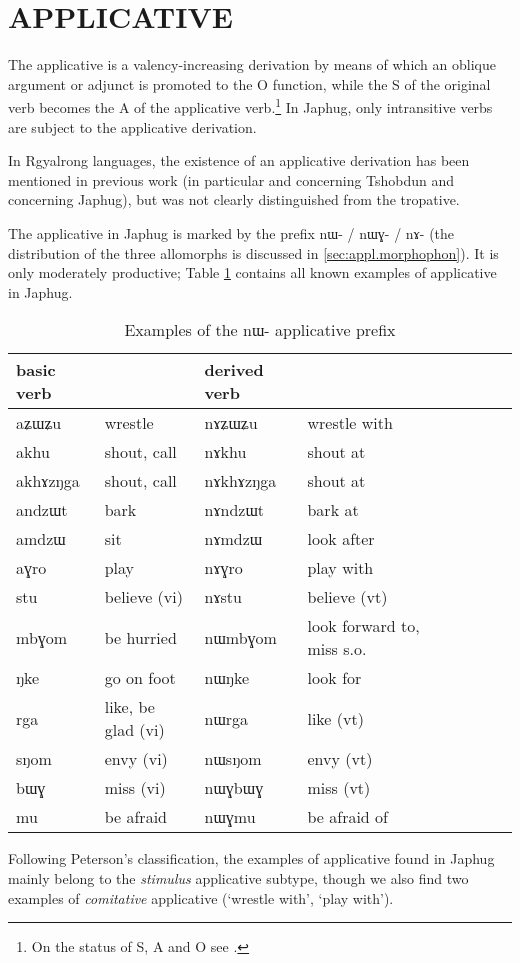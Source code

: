 \documentclass[oldfontcommands,twoside,a4paper,12pt]{article}
\newcommand{\ipa}[1]{{\phon \mbox{#1}}} %
\begin{document}
\section{\uppercase{applicative}} \label{sub:applicative}
The applicative is a valency-increasing derivation by means of which an oblique argument or adjunct is promoted to the O function, while the S of the original  verb becomes the A of the applicative verb.\footnote{On the status of S, A and O see \citet{haspelmath11SAPTR}. } In Japhug, only intransitive verbs are subject to the applicative derivation. 

In Rgyalrong languages, the existence of an applicative derivation has been mentioned in previous work (in particular  \citealt{jackson06paisheng} and  \citealt{jackson13morpho} concerning   Tshobdun   and \citealt{jacques08} concerning Japhug), but was not clearly distinguished from the tropative.

The applicative in Japhug is marked by the prefix \ipa{nɯ-} / \ipa{nɯɣ-} / \ipa{nɤ-} (the distribution of the three allomorphs is discussed in \ref{sec:appl.morphophon}). It is only moderately productive; Table \ref{tab:applicative} contains all known examples of applicative in Japhug.

\begin{table}[h]
\caption{Examples of the \ipa{nɯ}- applicative prefix}\label{tab:applicative} \centering
\begin{tabular}{lllllllll} \toprule
basic verb  & &derived  verb &\\
\midrule
 \ipa{aʑɯʑu}  & wrestle	& \ipa{nɤʑɯʑu}  & wrestle with\\
\ipa{akhu}  &	shout, call&\ipa{nɤkhu}  & shout at \\
\ipa{akhɤzŋga}&	shout, call&\ipa{nɤkhɤzŋga}  & shout at \\
\ipa{andzɯt}  &	bark&\ipa{nɤndzɯt}  & bark at \\
\ipa{amdzɯ}  &sit & \ipa{nɤmdzɯ}  &look after\\
\ipa{aɣro}&play&\ipa{nɤɣro} & play with \\
    \ipa{stu}  &believe (vi)	& \ipa{nɤstu}  & believe (vt)\\
\midrule
\ipa{mbɣom}  &	be hurried & \ipa{nɯmbɣom}  & look  forward to, miss s.o.\\
\ipa{ŋke}  &go on foot	& \ipa{nɯŋke}  & look for \\
\ipa{rga}  &	like, be glad (vi) & \ipa{nɯrga}  &like (vt) \\
\ipa{sŋom}  &	envy (vi) & \ipa{nɯsŋom}  &envy (vt) \\
\midrule
  \ipa{bɯɣ}  &miss (vi)	& \ipa{nɯɣbɯɣ}  & miss (vt)\\
  \ipa{mu} & be afraid & \ipa{nɯɣmu} & be afraid of \\
\bottomrule
\end{tabular}
\end{table}
Following Peterson's \citeyear{peterson07appl} classification, the examples of applicative found in Japhug mainly belong to the \textit{ stimulus} applicative subtype, though we also find two examples of \textit{comitative} applicative (`wrestle with', `play with').
  
\end{document}
